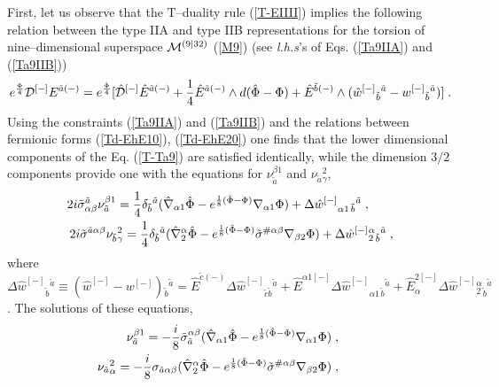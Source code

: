 \documentclass[a4paper,11pt]{article}
\begin{document}
First, let us observe that the T--duality rule 
(\ref{T-EIIII}) implies the following relation between 
the type IIA and type IIB representations for the torsion of 
nine--dimensional superspace ${\cal M}^{(9|32)}$ (\ref{M9}) 
(see {\it l.h.s}'s of Eqs. 
(\ref{Ta9IIA}) and (\ref{Ta9IIB}))
\begin{eqnarray} 
\label{T-Ta9} 
e^{{\Phi \over 4}}{\cal D}^{[-]} {E}^{\tilde{a}(-)}
= 
e^{{\hat{\Phi} \over 4}} [ \hat{{\cal D}}^{[-]} \hat{E}^{\tilde{a}(-)} 
+ {1\over 4} \hat{E}^{\tilde{a}(-)}\wedge d(\hat{\Phi}-{\Phi}) + 
 \hat{E}^{\tilde{b}(-)}\wedge (\hat{w}^{[-]}{}_{\tilde{b}}{}^{\tilde{a}}- 
{w}^{[-]}{}_{\tilde{b}}{}^{\tilde{a}})]\; .
\end{eqnarray}
Using the constraints  (\ref{Ta9IIA}) and (\ref{Ta9IIB}) 
and the relations between fermionic forms 
(\ref{Td-EhE10}), (\ref{Td-EhE20}) one finds that the lower dimensional 
components of the Eq. (\ref{T-Ta9}) are satisfied identically, while the 
dimension $3/2$ components provide one with the equations for 
 $\nu^{ {\beta}1}_{ {\tilde{a}}}$ and 
$\nu_{ {\tilde{a}}}{}^2_{ {\gamma}}$,  
\begin{eqnarray}\label{Eqnu-1}
2i \tilde{\sigma}^{\tilde{a}}_{\alpha\beta} 
\nu^{ {\beta}1}_{ {\tilde{a}}} = {1\over 4} \delta_{\tilde{b}}{}^{\tilde{a}}
(\hat{\nabla}_{\alpha 1}\hat{\Phi}- e^{{1\over 8} (\hat{\Phi}- \Phi)}
{\nabla}_{\alpha 1}{\Phi}) 
+ \Delta \hat{w}^{[-]}{}_{\alpha 1 \, \tilde{b}}{}^{\tilde{a}}\; , 
\qquad \\  
\label{Eqnu2} 
2i \tilde{\sigma}^{\tilde{a}\alpha\beta} 
\nu_{ {\tilde{b}}}{}^2_{ {\gamma}}
= 
{1\over 4} \delta_{\tilde{b}}{}^{\tilde{a}}
(\hat{\nabla}^{\alpha}_2 \hat{\Phi}- e^{{1\over 8} (\hat{\Phi}- \Phi)}
\tilde{\sigma}^{\# \alpha\beta}
{\nabla}_{\beta 2}{\Phi}) 
+ \Delta \hat{w}^{[-]}{}^{\alpha}_2{}_{\tilde{b}}{}^{\tilde{a}}\; ,
\end{eqnarray}
where 
$\Delta \hat{w}^{[-]}{}_{\tilde{b}}{}^{\tilde{a}}\equiv
(\hat{w}^{[-]}- {w}^{[-]}){}_{\tilde{b}}{}^{\tilde{a}}= 
\hat{E}^{\tilde{c}(-)}\Delta \hat{w}^{[-]}{}_{\tilde{c}\tilde{b}}{}^{\tilde{a}}
+ \hat{E}^{\alpha 1 [-]} 
\Delta \hat{w}^{[-]}{}_{\alpha 1 \, \tilde{b}}{}^{\tilde{a}}
+ \hat{E}^{2[-]}_{\alpha}
\Delta \hat{w}^{[-]}{}^{\alpha}_2{}_{\tilde{b}}{}^{\tilde{a}}$. 
The solutions of these equations, 
\begin{eqnarray}\label{Snu1}
\nu^{ {\beta}1}_{ {\tilde{a}}} = - {i\over 8} 
\tilde{\sigma}_{\tilde{a}}^{\alpha\beta} 
(\hat{\nabla}_{\alpha 1}\hat{\Phi}- e^{{1\over 8} (\hat{\Phi}- \Phi)}
{\nabla}_{\alpha 1}{\Phi}) \; , \qquad 
\\  
\label{Snu2} 
\nu_{ {\tilde{a}}}{}^2_{ {\alpha}} = - {i\over 8}  
{\sigma}_{\tilde{a}\alpha\beta} 
(\hat{\nabla}^{\alpha}_2 \hat{\Phi}- e^{{1\over 8} (\hat{\Phi}- \Phi)}
\tilde{\sigma}^{\# \alpha\beta} {\nabla}_{\beta 2}{\Phi}) \; , \qquad
\end{eqnarray} 
\end{document}
